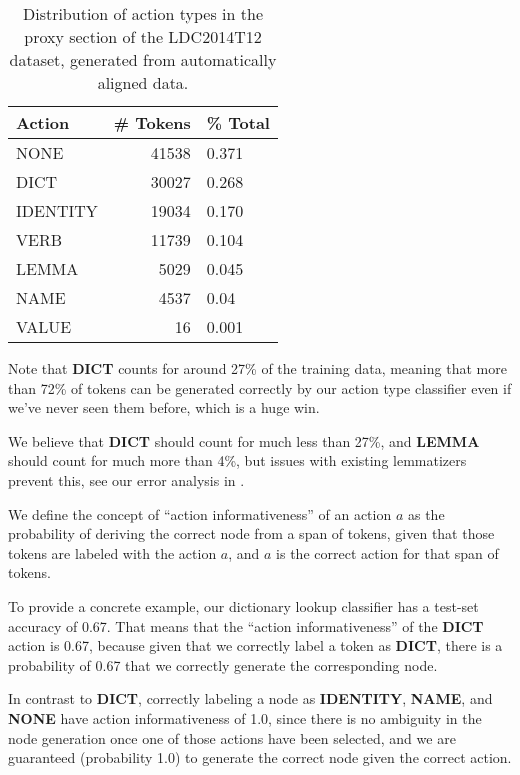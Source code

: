 \documentclass[11pt]{article}
\begin{document}
\begin{table}[h]
\begin{center}
\begin{tabular}{|l|rl|}
\hline \bf Action & \bf \# Tokens & \bf \% Total \\ \hline
NONE & 41538 & 0.371\\
DICT & 30027 & 0.268 \\
IDENTITY & 19034 & 0.170 \\
VERB & 11739 & 0.104 \\
LEMMA & 5029 & 0.045 \\
NAME & 4537 & 0.04 \\
VALUE & 16  & 0.001\\
\hline
\end{tabular}
\end{center}
\caption{\label{font-table} Distribution of action types in the proxy section of the LDC2014T12 dataset, generated from automatically aligned data. }
\end{table}

Note that \textbf{DICT} counts for around 27\% of the training data, meaning that more than 72\% of tokens can be generated correctly by our action type classifier even if we've never seen them before, which is a huge win.

We believe that \textbf{DICT} should count for much less than 27\%, and \textbf{LEMMA} should count for much more than 4\%, but issues with existing lemmatizers prevent this, see our error analysis in .


We define the concept of ``action informativeness'' of an action $a$ as the probability of deriving the correct node from a span of tokens, given that those tokens are labeled with the action $a$, and $a$ is the correct action for that span of tokens.

To provide a concrete example, our dictionary lookup classifier has a test-set accuracy of 0.67. That means that the ``action informativeness'' of the \textbf{DICT} action is 0.67, because given that we correctly label a token as \textbf{DICT}, there is a probability of 0.67 that we correctly generate the corresponding node.

In contrast to \textbf{DICT}, correctly labeling a node as \textbf{IDENTITY}, \textbf{NAME}, and \textbf{NONE} have action informativeness of 1.0, since there is no ambiguity in the node generation once one of those actions have been selected, and we are guaranteed (probability 1.0) to generate the correct node given the correct action.
\end{document}

